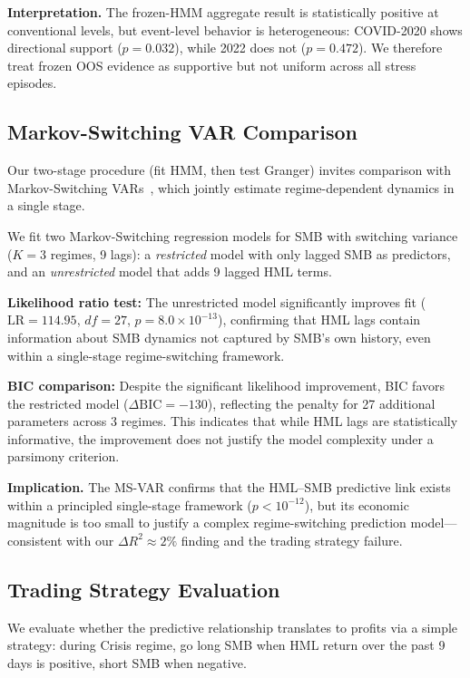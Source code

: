 \documentclass{uai2026}
\begin{document}
\textbf{Interpretation.} The frozen-HMM aggregate result is statistically positive
at conventional levels, but event-level behavior is heterogeneous: COVID-2020
shows directional support ($p = 0.032$), while 2022 does not ($p = 0.472$).
We therefore treat frozen OOS evidence as supportive but not uniform across
all stress episodes.

\subsection{Markov-Switching VAR Comparison}
\label{sec:msvar}

Our two-stage procedure (fit HMM, then test Granger) invites comparison with
Markov-Switching VARs~\cite{krolzig1997markov}, which jointly estimate
regime-dependent dynamics in a single stage.

We fit two Markov-Switching regression models for SMB with switching variance
($K = 3$ regimes, 9 lags): a \emph{restricted} model with only lagged SMB as
predictors, and an \emph{unrestricted} model that adds 9 lagged HML terms.

\textbf{Likelihood ratio test:} The unrestricted model significantly improves fit
($\text{LR} = 114.95$, $df = 27$, $p = 8.0 \times 10^{-13}$), confirming that
HML lags contain information about SMB dynamics not captured by SMB's own history,
even within a single-stage regime-switching framework.

\textbf{BIC comparison:} Despite the significant likelihood improvement, BIC favors
the restricted model ($\Delta\text{BIC} = -130$), reflecting the penalty for 27
additional parameters across 3 regimes. This indicates that while HML lags are
statistically informative, the improvement does not justify the model complexity
under a parsimony criterion.

\textbf{Implication.} The MS-VAR confirms that the HML--SMB predictive link exists
within a principled single-stage framework ($p < 10^{-12}$), but its economic magnitude
is too small to justify a complex regime-switching prediction model---consistent with
our $\Delta R^2 \approx 2\%$ finding and the trading strategy failure.

\subsection{Trading Strategy Evaluation}
\label{sec:trading}

We evaluate whether the predictive relationship translates to profits via a simple
strategy: during Crisis regime, go long SMB when HML return over the past 9 days
is positive, short SMB when negative.
\end{document}
